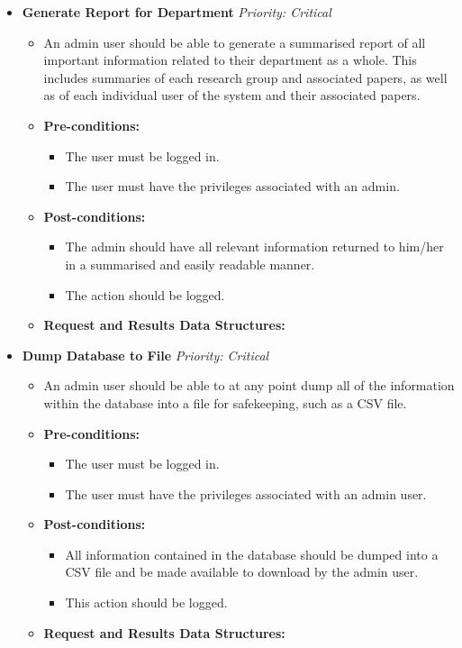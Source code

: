 \documentclass{article}
\begin{document}
				\begin{itemize}
					\item \textbf{Generate Report for Department} \hfill \textit{Priority: Critical}
					\begin{itemize}
						\item An admin user should be able to generate a summarised report of all important information related to their department as a whole. This includes summaries of each research group and associated papers, as well as of each individual user of the system and their associated papers.
						\item \textbf{Pre-conditions:}
						\begin{itemize}
							\item The user must be logged in.
							\item The user must have the privileges associated with an admin.
						\end{itemize}
						\item \textbf{Post-conditions:}
						\begin{itemize}
							\item The admin should have all relevant information returned to him/her in a summarised and easily readable manner.
							\item The action should be logged.
						\end{itemize}
						\item \textbf{Request and Results Data Structures:}
					\end{itemize}

					\item \textbf{Dump Database to File} \hfill \textit{Priority: Critical}
					\begin{itemize}
						\item An admin user should be able to at any point dump all of the information within the database into a file for safekeeping, such as a CSV file.
						\item \textbf{Pre-conditions:}
						\begin{itemize}
							\item The user must be logged in.
							\item The user must have the privileges associated with an admin user.
						\end{itemize}
						\item \textbf{Post-conditions:}
						\begin{itemize}
							\item All information contained in the database should be dumped into a CSV file and be made available to download by the admin user.
							\item This action should be logged.
						\end{itemize}
						\item \textbf{Request and Results Data Structures:}
					\end{itemize}
				\end{itemize}
\end{document}
